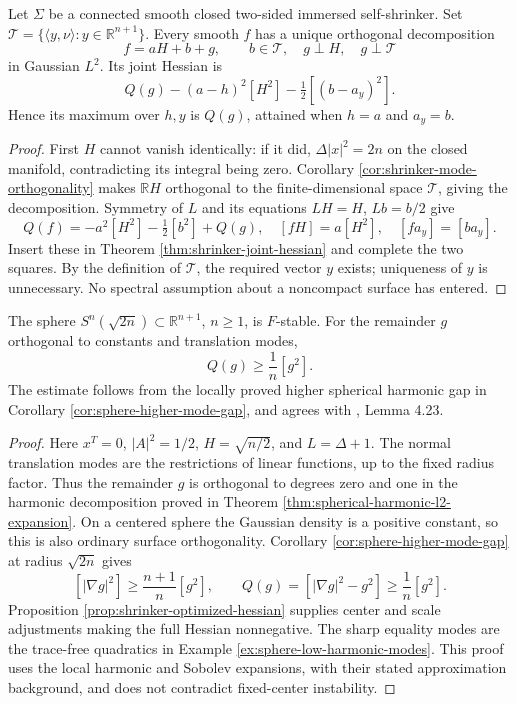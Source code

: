 \begin{proposition}\label{prop:shrinker-optimized-hessian}
Let $\Sigma$ be a connected smooth closed two-sided immersed self-shrinker. Set $\mathcal T=\{\langle y,\nu\rangle:y\in\mathbb R^{n+1}\}$. Every smooth $f$ has a unique orthogonal decomposition
\[
 f=aH+b+g,\qquad b\in\mathcal T,\quad g\perp H,\quad g\perp\mathcal T
\]
in Gaussian $L^2$. Its joint Hessian is
\[
 Q(g)-(a-h)^2[H^2]-\tfrac12[(b-a_y)^2].
\]
Hence its maximum over $h,y$ is $Q(g)$, attained when $h=a$ and $a_y=b$.
\end{proposition}
\begin{proof}
First $H$ cannot vanish identically: if it did, $\Delta|x|^2=2n$ on the closed manifold, contradicting its integral being zero. Corollary \ref{cor:shrinker-mode-orthogonality} makes $\mathbb RH$ orthogonal to the finite-dimensional space $\mathcal T$, giving the decomposition. Symmetry of $L$ and its equations $LH=H$, $Lb=b/2$ give
\[
 Q(f)=-a^2[H^2]-\tfrac12[b^2]+Q(g),\quad
 [fH]=a[H^2],\quad [fa_y]=[ba_y].
\]
Insert these in Theorem \ref{thm:shrinker-joint-hessian} and complete the two squares. By the definition of $\mathcal T$, the required vector $y$ exists; uniqueness of $y$ is unnecessary. No spectral assumption about a noncompact surface has entered.
\end{proof}

\begin{proposition}\label{prop:shrinker-sphere-f-stable}
The sphere $S^n(\sqrt{2n})\subset\mathbb R^{n+1}$, $n\geq1$, is $F$-stable. For the remainder $g$ orthogonal to constants and translation modes,
\[
 Q(g)\geq\frac1n[g^2].
\]
The estimate follows from the locally proved higher spherical harmonic gap in Corollary \ref{cor:sphere-higher-mode-gap}, and agrees with \cite{CM12}, Lemma 4.23.
\end{proposition}
\begin{proof}
Here $x^T=0$, $|A|^2=1/2$, $H=\sqrt{n/2}$, and $L=\Delta+1$. The normal translation modes are the restrictions of linear functions, up to the fixed radius factor. Thus the remainder $g$ is orthogonal to degrees zero and one in the harmonic decomposition proved in Theorem \ref{thm:spherical-harmonic-l2-expansion}. On a centered sphere the Gaussian density is a positive constant, so this is also ordinary surface orthogonality. Corollary \ref{cor:sphere-higher-mode-gap} at radius $\sqrt{2n}$ gives
\[
 [|\nabla g|^2]\geq\frac{n+1}{n}[g^2],
 \qquad Q(g)=[|\nabla g|^2-g^2]\geq\frac1n[g^2].
\]
Proposition \ref{prop:shrinker-optimized-hessian} supplies center and scale adjustments making the full Hessian nonnegative. The sharp equality modes are the trace-free quadratics in Example \ref{ex:sphere-low-harmonic-modes}. This proof uses the local harmonic and Sobolev expansions, with their stated approximation background, and does not contradict fixed-center instability.
\end{proof}

